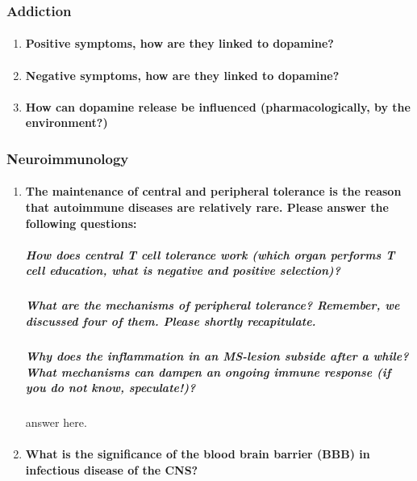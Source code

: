 \documentclass[12pt,article,oneside,a4paper]{memoir}
\begin{document}
\subsubsection{Addiction}
\begin{enumerate}
\item \paragraph{Positive symptoms, how are they linked to dopamine?}
\item \paragraph{Negative symptoms, how are they linked to dopamine?}
\item \paragraph{How can dopamine release be influenced (pharmacologically, by the environment?)}
\end{enumerate}

\subsubsection{Neuroimmunology}
\begin{enumerate}
\item \paragraph{The maintenance of central and peripheral tolerance is the reason that autoimmune diseases are relatively rare. Please answer the following questions:}
\subparagraph{How does central T cell tolerance work (which organ performs T cell education, what is negative and positive selection)?}
\subparagraph{What are the mechanisms of peripheral tolerance? Remember, we discussed four of them. Please shortly recapitulate.}
\subparagraph{Why does the inflammation in an MS-lesion subside after a while? What mechanisms can dampen an ongoing immune response (if you do not know, speculate!)?} answer here.
\item \paragraph{What is the significance of the blood brain barrier (BBB) in infectious disease of the CNS?}
\end{enumerate}
\end{document}
